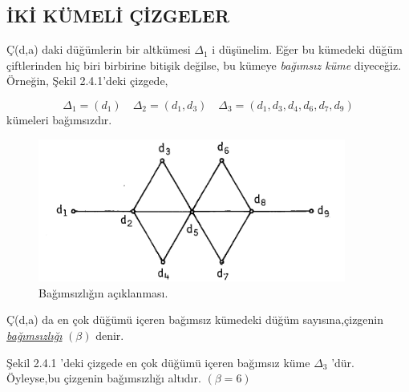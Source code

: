 \documentclass[11pt]{amsbook}
\begin{document}



\subsection{İKİ KÜMELİ ÇİZGELER}

 Ç(d,a) daki düğümlerin bir altkümesi  $\Delta_1 $ i düşünelim.
 Eğer bu kümedeki düğüm çiftlerinden 
 hiç biri birbirine bitişik değilse,
 bu kümeye \textit{ bağımsız küme} 
 diyeceğiz. Örneğin, Şekil 2.4.1'deki çizgede,
 
    $$
   \Delta_1 = \left(  d_1 \right)\quad
    \Delta_2 = \left(  d_1 ,d_3 \right) \quad
    \Delta_3 = \left(  d_1 ,d_3,d_4,d_6,d_7, d_9 \right)
     $$
kümeleri bağımsızdır.


     \begin{figure}[htb]
	    \centering
	    \includegraphics[width=0.9\textwidth]{images/ceyhun-072-Page-fig01}
	    \caption{Bağımsızlığın açıklanması.}
    	
    \end{figure}
    
    
    \begin{definition}{}
     Ç(d,a) da en çok düğümü içeren bağımsız kümedeki düğüm sayısına,çizgenin 
    \textit{\underline{ bağımsızlığı}} 
    $  \left(  \beta \right) $ denir.
	\end{definition}
    
Şekil 2.4.1 'deki çizgede en çok
düğümü içeren bağımsız küme  
$\Delta_3 $ 'dür.
Öyleyse,bu çizgenin bağımsızlığı altıdır.
$  \left(  \beta =6 \right) $
\end{document}
